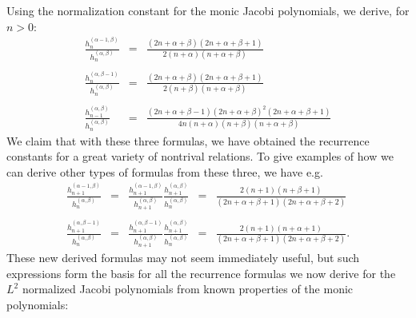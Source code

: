 Using the normalization constant for the monic Jacobi polynomials, we derive,
for $n > 0$:
\[ \begin{array}{lll}
     \frac{h_n^{(\alpha - 1, \beta)}}{h_n^{(\alpha, \beta)}} & = & \frac{(2 n
     + \alpha + \beta) (2 n + \alpha + \beta + 1)}{2 (n + \alpha) (n + \alpha
     + \beta)}\\
     &  & \\
     \frac{h_n^{(\alpha, \beta - 1)}}{h_n^{(\alpha, \beta)}} & = & \frac{(2 n
     + \alpha + \beta) (2 n + \alpha + \beta + 1)}{2 (n + \beta) (n + \alpha +
     \beta)}\\
     &  & \\
     \frac{h_{n - 1}^{(\alpha, \beta)}}{h_n^{(\alpha, \beta)}} & = & \frac{(2
     n + \alpha + \beta - 1) (2 n + \alpha + \beta)^2 (2 n + \alpha + \beta +
     1)}{4 n (n + \alpha) (n + \beta) (n + \alpha + \beta)}
   \end{array} \]
We claim that with these three formulas, we have obtained the recurrence
constants for a great variety of nontrival relations. To give examples of how
we can derive other types of formulas from these three, we have e.g.
\[ \begin{array}{lllll}
     \frac{h^{(\alpha - 1, \beta)}_{n + 1}}{h_n^{(\alpha, \beta)}} & = &
     \frac{h_{n + 1}^{(\alpha - 1, \beta)}}{h_{n + 1}^{(\alpha, \beta)}} 
     \frac{h_{n + 1}^{(\alpha, \beta)}}{h_n^{(\alpha, \beta)}} & = & \frac{2
     (n + 1) (n + \beta + 1)}{(2 n + \alpha + \beta + 1) (2 n + \alpha + \beta
     + 2)}\\
     &  &  &  & \\
     \frac{h_{n + 1}^{(\alpha, \beta - 1)}}{h_n^{(\alpha, \beta)}} & = &
     \frac{h_{n + 1}^{(\alpha, \beta - 1)}}{h_{n + 1}^{(\alpha, \beta)}} 
     \frac{h_{n + 1}^{(\alpha, \beta)}}{h_n^{(\alpha, \beta)}} & = & \frac{2
     (n + 1) (n + \alpha + 1)}{(2 n + \alpha + \beta + 1) (2 n + \alpha +
     \beta + 2)} .
   \end{array} \]
These new derived formulas may not seem immediately useful, but such
expressions form the basis for all the recurrence formulas we now derive for
the $L^2$ normalized Jacobi polynomials from known properties of the monic
polynomials:


